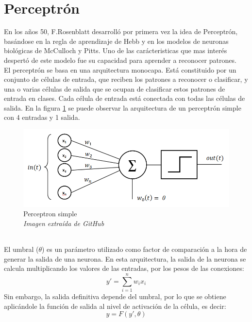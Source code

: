 \section {Perceptrón}
En los años 50, F.Rosenblatt desarrolló por primera vez la idea de Perceptrón, basándose en la regla de aprendizaje de Hebb y en los modelos de neuronas biológicas de McCulloch y Pitts. Uno de las carácteristicas que mas interés despertó de este modelo fue su capacidad para aprender a reconocer patrones.\\
El perceptrón se basa en una arquitectura monocapa. Está constituido por un conjunto de células de entrada, que reciben los patrones a reconocer o clasificar, y una o varias células de salida que se ocupan de clasificar estos patrones de entrada en clases. Cada célula de entrada está conectada con todas las células de salida. En la figura \ref{perceptron} se puede observar la arquitectura de un perceptrón simple con 4 entradas y 1 salida.
\begin{figure}[htp]
\centering
\vspace{-1em}
\includegraphics[scale=0.5]{images/perceptron.png}
\caption{Perceptron simple\\\textit{Imagen extraída de GitHub}}
\label{perceptron}
\end{figure}
\\El umbral (${\theta}$) es un parámetro utilizado como factor de comparación a la hora de generar la salida de una neurona. En esta arquitectura, la salida de la neurona se calcula multiplicando los valores de las entradas, por los pesos de las conexiones:
\begin{equation}\label{prop_perceptron}
y' =  \sum_{i=1}^{n} w_{i}x_{i}
\end{equation}
Sin embargo, la salida definitiva depende del umbral, por lo que se obtiene aplicándole la función de salida al nivel de activación de la célula, es decir:
\begin{equation}\label{salida_perceptron}
y =  F(y', \theta)
\end{equation}
